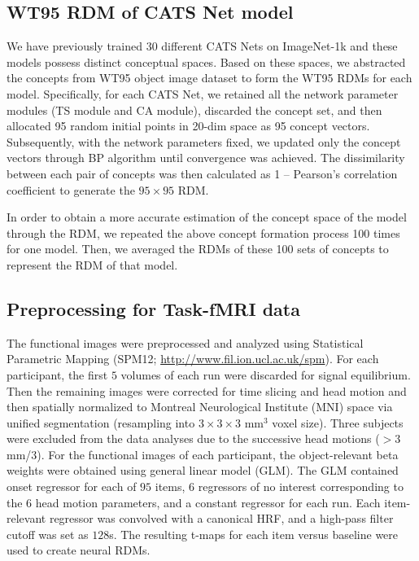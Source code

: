 \documentclass[pdflatex,sn-mathphys-num,lineno]{sn-jnl}%
\begin{document}
\begin{CJK}{UTF8}{gbsn}
\subsection{WT95 RDM of CATS Net model}
We have previously trained 30 different CATS Nets on ImageNet-1k and these models possess distinct conceptual spaces. Based on these spaces, we abstracted the concepts from WT95 object image dataset to form the WT95 RDMs for each model. Specifically, for each CATS Net, we retained all the network parameter modules (TS module and CA module), discarded the concept set, and then allocated 95 random initial points in 20-dim space as 95 concept vectors. Subsequently, with the network parameters fixed, we updated only the concept vectors through BP algorithm until convergence was achieved. The dissimilarity between each pair of concepts was then calculated as 1 – Pearson’s correlation coefficient to generate the $95\times95$ RDM. 

In order to obtain a more accurate estimation of the concept space of the model through the RDM, we repeated the above concept formation process 100 times for one model. Then, we averaged the RDMs of these 100 sets of concepts to represent the RDM of that model.

\subsection{Preprocessing for Task-fMRI data}
The functional images were preprocessed and analyzed using Statistical Parametric Mapping (SPM12; \url{http://www.fil.ion.ucl.ac.uk/spm}). For each participant, the first $5$ volumes of each run were discarded for signal equilibrium. Then the remaining images were corrected for time slicing and head motion and then spatially normalized to Montreal Neurological Institute (MNI) space via unified segmentation (resampling into $3\times3\times3$ mm$^3$ voxel size). Three subjects were excluded from the data analyses due to the successive head motions ($>3$ mm/$3$\textdegree). For the functional images of each participant, the object-relevant beta weights were obtained using general linear model (GLM). The GLM contained onset regressor for each of $95$ items, $6$ regressors of no interest corresponding to the $6$ head motion parameters, and a constant regressor for each run. Each item-relevant regressor was convolved with a canonical HRF, and a high-pass filter cutoff was set as $128$s. The resulting t-maps for each item versus baseline were used to create neural RDMs.


\end{CJK}
\end{document}
